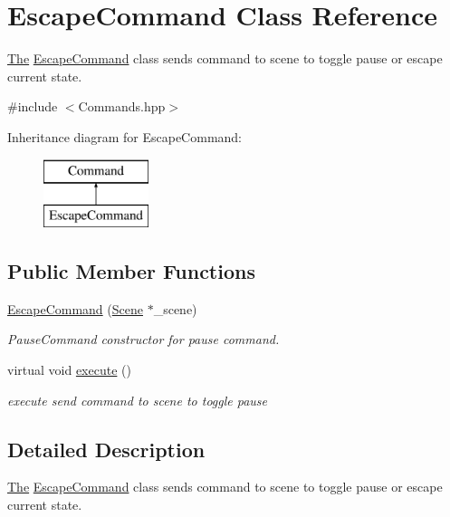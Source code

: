 \hypertarget{class_escape_command}{}\section{Escape\+Command Class Reference}
\label{class_escape_command}


\hyperlink{namespace_the}{The} \hyperlink{class_escape_command}{Escape\+Command} class sends command to scene to toggle pause or escape current state.  




{\ttfamily \#include $<$Commands.\+hpp$>$}

Inheritance diagram for Escape\+Command\+:\begin{figure}[H]
\begin{center}
\leavevmode
\includegraphics[height=2.000000cm]{class_escape_command}
\end{center}
\end{figure}
\subsection*{Public Member Functions}
\begin{DoxyCompactItemize}
\item 
\hyperlink{class_escape_command_a2e9dbb0c95f0f38c8a2b617cfb50c6b1}{Escape\+Command} (\hyperlink{class_scene}{Scene} $\ast$\+\_\+scene)
\begin{DoxyCompactList}\small\item\em Pause\+Command constructor for pause command. \end{DoxyCompactList}\item 
\hypertarget{class_escape_command_a00172ea92e141f1319e6bc7a17c26be2}{}virtual void \hyperlink{class_escape_command_a00172ea92e141f1319e6bc7a17c26be2}{execute} ()\label{class_escape_command_a00172ea92e141f1319e6bc7a17c26be2}

\begin{DoxyCompactList}\small\item\em execute send command to scene to toggle pause \end{DoxyCompactList}\end{DoxyCompactItemize}


\subsection{Detailed Description}
\hyperlink{namespace_the}{The} \hyperlink{class_escape_command}{Escape\+Command} class sends command to scene to toggle pause or escape current state. 

